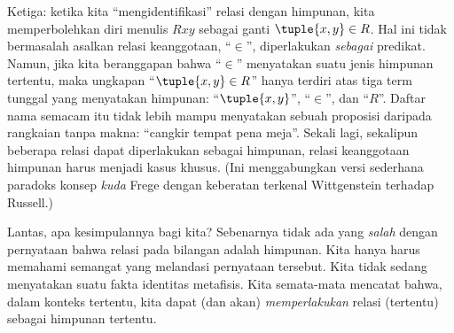 \documentclass[../../../include/open-logic-section]{subfiles}
\begin{document}
Ketiga: ketika kita ``mengidentifikasi'' relasi dengan himpunan, kita
memperbolehkan diri menulis $Rxy$ sebagai ganti
$\tuple{x,y} \in R$. Hal ini tidak bermasalah asalkan relasi keanggotaan,
``$\in$'', diperlakukan \emph{sebagai} predikat. Namun, jika kita beranggapan
bahwa ``$\in$'' menyatakan suatu jenis himpunan tertentu, maka ungkapan
``$\tuple{x,y} \in R$'' hanya terdiri atas tiga term tunggal yang menyatakan
himpunan: ``$\tuple{x,y}$'', ``$\in$'', dan ``$R$''. Daftar nama semacam itu
tidak lebih mampu menyatakan sebuah proposisi daripada rangkaian tanpa makna:
``cangkir tempat pena meja''. Sekali lagi, sekalipun beberapa relasi dapat
diperlakukan sebagai himpunan, relasi keanggotaan himpunan harus menjadi kasus
khusus. (Ini menggabungkan versi sederhana paradoks konsep \emph{kuda} Frege
dengan keberatan terkenal Wittgenstein terhadap Russell.)

Lantas, apa kesimpulannya bagi kita? Sebenarnya tidak ada yang \emph{salah}
dengan pernyataan bahwa relasi pada bilangan adalah himpunan. Kita hanya harus
memahami semangat yang melandasi pernyataan tersebut. Kita tidak sedang
menyatakan suatu fakta identitas metafisis. Kita semata-mata mencatat bahwa,
dalam konteks tertentu, kita dapat (dan akan) \emph{memperlakukan} relasi
(tertentu) sebagai himpunan tertentu.
\end{document}
